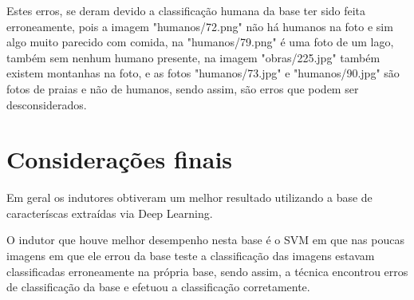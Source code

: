 \documentclass[
article,			%
11pt,				%
oneside,			%
a4paper,			%
english,			%
brazil,				%
sumario=tradicional,
]{abntex2}
\begin{document}
	Estes erros, se deram devido a classificação humana da base ter sido feita erroneamente, pois a imagem "humanos/72.png" não há humanos na foto e sim algo muito parecido com comida, na "humanos/79.png" é uma foto de um lago, também sem nenhum humano presente, na imagem "obras/225.jpg" também existem montanhas na foto, e as fotos "humanos/73.jpg" e "humanos/90.jpg"  são fotos de praias e não de humanos, sendo assim, são erros que podem ser desconsiderados.
	
	\section{Considerações finais}
	
	Em geral os indutores obtiveram um melhor resultado utilizando a base de caracteríscas extraídas via Deep Learning.
	
	O indutor que houve melhor desempenho nesta base é o SVM em que nas poucas imagens em que ele errou da base teste a classificação das imagens estavam classificadas erroneamente na própria base, sendo assim, a técnica encontrou erros de classificação da base e efetuou a classificação corretamente. 
	
	\postextual
	
	
	
	
	
		
		
\end{document}

